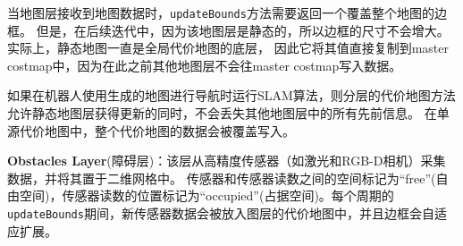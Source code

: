 当地图层接收到地图数据时，\texttt{updateBounds}方法需要返回一个覆盖整个地图的边框。 但是，在后续迭代中，因为该地图层是静态的，所以边框的尺寸不会增大。 
实际上，静态地图一直是全局代价地图的底层，
因此它将其值直接复制到master costmap中，因为在此之前其他地图层不会往master costmap写入数据。

如果在机器人使用生成的地图进行导航时运行SLAM算法，则分层的代价地图方法允许静态地图层获得更新的同时，不会丢失其他地图层中的所有先前信息。 在单源代价地图中，整个代价地图的数据会被覆盖写入。


\textbf{\color{blue}Obstacles Layer}{(障碍层)}：该层从高精度传感器（如激光和RGB-D相机）采集数据，并将其置于二维网格中。 传感器和传感器读数之间的空间标记为“free”(自由空间)，传感器读数的位置标记为“occupied”(占据空间)。每个周期的\texttt{updateBounds}期间，新传感器数据会被放入图层的代价地图中，并且边框会自适应扩展。

